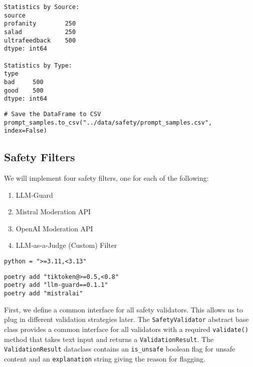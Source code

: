 \begin{verbatim}
Statistics by Source:
source
profanity        250
salad            250
ultrafeedback    500
dtype: int64

Statistics by Type:
type
bad     500
good    500
dtype: int64
\end{verbatim}


\begin{verbatim}
# Save the DataFrame to CSV
prompt_samples.to_csv("../data/safety/prompt_samples.csv", index=False)
\end{verbatim}

\subsection{Safety Filters}

We will implement four safety filters, one for each of the following:
\begin{enumerate}
\item LLM-Guard
\item Mistral Moderation API
\item OpenAI Moderation API 
\item LLM-as-a-Judge (Custom) Filter
\end{enumerate}

\begin{verbatim}
python = ">=3.11,<3.13"
\end{verbatim}

\begin{verbatim}
poetry add "tiktoken@>=0.5,<0.8"
poetry add "llm-guard==0.1.1"
poetry add "mistralai"
\end{verbatim}

First, we define a common interface for all safety validators. This allows us to plug in different validation strategies later. The \texttt{SafetyValidator} abstract base class provides a common interface for all validators with a required \texttt{validate()} method that takes text input and returns a \texttt{ValidationResult}. The \texttt{ValidationResult} dataclass contains an \texttt{is\_unsafe} boolean flag for unsafe content and an \texttt{explanation} string giving the reason for flagging.


